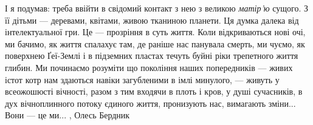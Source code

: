 І я подумав: треба ввійти в свідомий контакт з нею з великою \emph{матір’ю} сущого. З
її дітьми — деревами, квітами, живою тканиною планети. Ця думка далека від
інтелектуальної гри. Це — прозріння в суть життя. Коли відкриваються нові очі,
ми бачимо, як життя спалахує там, де раніше нас панувала смерть, ми чуємо, як
поверхнею Ґеї-Землі і в підземних пластах течуть буйні ріки трепетного життя
глибин. Ми починаємо розуміти що покоління наших попередників — живих істот
котр нам здаються навіки загубленими в імлі минулого, — живуть у всеожошюсті
вічності, разом з тим входячи в плоть і кров, у душі сучасників, в дух
вічноплинного потоку єдиного життя, пронизують нас, вимагають зміни... Вони — це
ми...
, Олесь Бердник

